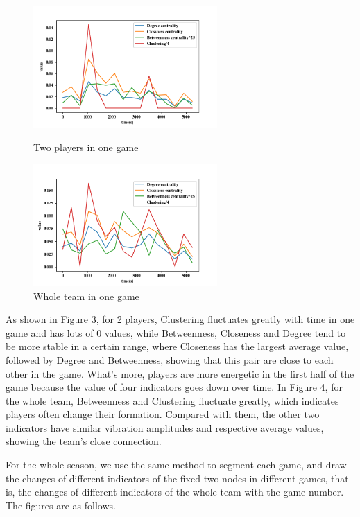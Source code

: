 \documentclass{mcmthesis}
\begin{document}
\begin{figure}[h]
	\begin{minipage}[t]{0.5\textwidth}
		\centering
		\includegraphics[width=7cm]{value_of_graph_per_game_2_players.png}
		\caption{Two players in one game\label{fig:aa}}
	\end{minipage}
	\qquad
	\begin{minipage}[t]{0.5\textwidth}
		\centering
		\includegraphics[width=7cm]{value_of_graph_per_game.png}
		\caption{Whole team in one game\label{fig:aa}}
	\end{minipage}
\end{figure}

As shown in Figure 3, for 2 players, Clustering fluctuates greatly with time in one game and has lots of 0 values, while Betweenness, Closeness and Degree tend to be more stable in a certain range, where Closeness has the largest average value, followed by Degree and Betweenness, showing that this pair are close to each other in the game. What's more, players are more energetic in the first half of the game because the value of four indicators goes down over time. In Figure 4, for the whole team, Betweenness and Clustering fluctuate greatly, which indicates players often change their formation. Compared with them, the other two indicators have similar vibration amplitudes and respective average values, showing the team's close connection.


For the whole season, we use the same method to segment each game, and draw the changes of different indicators of the fixed two nodes in different games, that is, the changes of different indicators of the whole team with the game number.
The figures are as follows.
\end{document}

